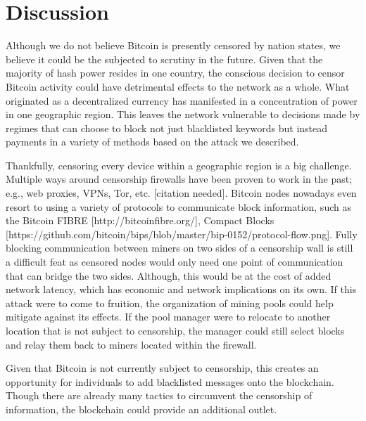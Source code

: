 \section{Discussion}
Although we do not believe Bitcoin is presently censored by nation states, we believe it could be the subjected to scrutiny in the future. Given that the majority of hash power resides in one country, the conscious decision to censor Bitcoin activity could have detrimental effects to the network as a whole. What originated as a decentralized currency has manifested in a concentration of power in one geographic region. This leaves the network vulnerable to decisions made by regimes that can choose to block not just blacklisted keywords but instead payments in a variety of methods based on the attack we described.

Thankfully, censoring every device within a geographic region is a big challenge. Multiple ways around censorship firewalls have been proven to work in the past; e.g., web proxies, VPNs, Tor, etc. [citation needed]. Bitcoin nodes nowadays even resort to using a variety of protocols to communicate block information, such as the Bitcoin FIBRE [http://bitcoinfibre.org/], Compact Blocks [https://github.com/bitcoin/bips/blob/master/bip-0152/protocol-flow.png]. Fully blocking communication between miners on two sides of a censorship wall is still a difficult feat as censored nodes would only need one point of communication that can bridge the two sides. Although, this would be at the cost of added network latency, which has economic and network implications on its own. If this attack were to come to fruition, the organization of mining pools could help mitigate against its effects. If the pool manager were to relocate to another location that is not subject to censorship, the manager could still select blocks and relay them back to miners located within the firewall.

Given that Bitcoin is not currently subject to censorship, this creates an opportunity for individuals to add blacklisted messages onto the blockchain. Though there are already many tactics to circumvent the censorship of information, the blockchain could provide an additional outlet.

